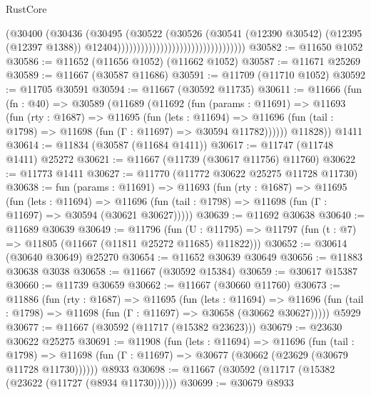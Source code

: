 \begin{lexlean}{RustCore}
\begin{coremodule}
                                                          (@30400
                                                            (@30436
                                                              (@30495
                                                                (@30522
                                                                  (@30526
                                                                    (@30541
                                                                      (@12390 @30542)
                                                                      (@12395 (@12397 @1388))
                                                                      @12404)))))))))))))))))))))))))))))))))
@30582 := @11650 @1052
@30586 := @11652 (@11656 @1052) (@11662 @1052)
@30587 := @11671 @25269
@30589 := @11667 (@30587 @11686)
@30591 := @11709 (@11710 @1052)
@30592 := @11705 @30591
@30594 := @11667 (@30592 @11735)
@30611 := @11666
    (fun (fn : @40) =>
    @30589
      (@11689
        (@11692
          (fun (params : @11691) =>
          @11693
            (fun (rty : @1687) =>
            @11695
              (fun (lets : @11694) =>
              @11696 (fun (tail : @1798) => @11698 (fun (Γ : @11697) => @30594 @11782))))))
        @11828))
    @1411
@30614 := @11834 (@30587 (@11684 @1411))
@30617 := @11747 (@11748 @1411) @25272
@30621 := @11667 (@11739 (@30617 @11756) @11760)
@30622 := @11773 @1411
@30627 := @11770 (@11772 @30622 @25275 @11728 @11730)
@30638 := fun (params : @11691) =>
  @11693
    (fun (rty : @1687) =>
    @11695
      (fun (lets : @11694) =>
      @11696 (fun (tail : @1798) => @11698 (fun (Γ : @11697) => @30594 (@30621 @30627)))))
@30639 := @11692 @30638
@30640 := @11689 @30639
@30649 := @11796
    (fun (U : @11795) => @11797 (fun (t : @7) => @11805 (@11667 (@11811 @25272 @11685) @11822)))
@30652 := @30614 (@30640 @30649) @25270
@30654 := @11652 @30639 @30649
@30656 := @11883 @30638 @3038
@30658 := @11667 (@30592 @15384)
@30659 := @30617 @15387
@30660 := @11739 @30659
@30662 := @11667 (@30660 @11760)
@30673 := @11886
    (fun (rty : @1687) =>
    @11695
      (fun (lets : @11694) =>
      @11696 (fun (tail : @1798) => @11698 (fun (Γ : @11697) => @30658 (@30662 @30627)))))
    @5929
@30677 := @11667 (@30592 (@11717 (@15382 @23623)))
@30679 := @23630 @30622 @25275
@30691 := @11908
    (fun (lets : @11694) =>
    @11696
      (fun (tail : @1798) =>
      @11698 (fun (Γ : @11697) => @30677 (@30662 (@23629 (@30679 @11728 @11730))))))
    @8933
@30698 := @11667 (@30592 (@11717 (@15382 (@23622 (@11727 (@8934 @11730))))))
@30699 := @30679 @8933

\end{coremodule}
\end{lexlean}
